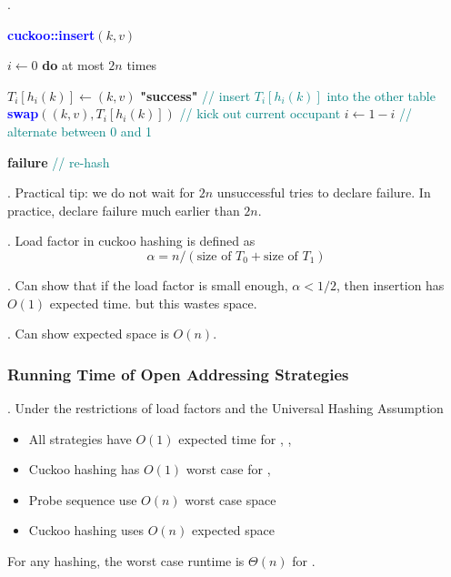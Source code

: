 \documentclass{article}
\begin{document}
\begin{codes}[].
    \begin{algorithm}[H]
        \caption{\textcolor{blue}{\textbf{cuckoo::insert}}$(k, v)$}
        $i \gets 0$\;
        \textbf{do} at most $2n$ times

        \Indp %
             {
                $T_i[h_i(k)] \gets (k, v)$\;
                \Return \textbf{"success"}\;
            }
            \textcolor{teal}{// insert $T_i[h_i(k)]$ into the other table}\;
            \textcolor{blue}{\textbf{swap}}$((k, v), T_i[h_i(k)])$ \textcolor{teal}{// kick out current occupant}\;
            $i \gets 1 - i$ \textcolor{teal}{// alternate between 0 and 1}\;
        \Indm %
        
        \Return \textbf{failure} \textcolor{teal}{// re-hash}\;
    \end{algorithm}
    \begin{comm}[].
        Practical tip: we do not wait for $2n$ unsuccessful tries to declare failure. In practice, declare failure much earlier than $2n$. 
    \end{comm}
\end{codes}

\begin{deff}.
    Load factor in cuckoo hashing is defined as 
    \[ \alpha = n \slash (\text{size of } T_0 + \text{size of } T_1) \]
\end{deff}

\begin{thmm}[].
    Can show that if the load factor is small enough, $\alpha < 1/2$, then insertion has $O(1)$ expected time. but this wastes space. 
\end{thmm}

\begin{thmm}[].
    Can show expected space is $O(n)$. 
\end{thmm}

\subsubsection{Running Time of Open Addressing Strategies} 

\begin{result}[].
    Under the restrictions of load factors and the Universal Hashing Assumption \begin{itemize}
        \item All strategies have $O(1)$ expected time for , ,  
        \item Cuckoo hashing has $O(1)$ worst case for ,   
        \item Probe sequence use $O(n)$ worst case space 
        \item Cuckoo hashing uses $O(n)$ expected space
    \end{itemize}
    For any hashing, the worst case runtime is $\Theta(n)$ for . 
\end{result}
\end{document}
